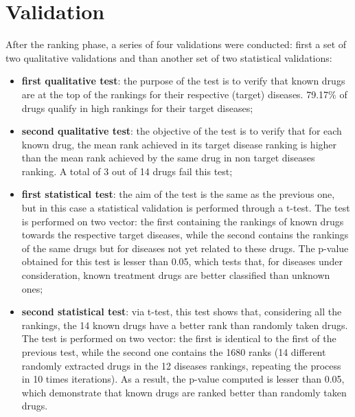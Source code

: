 

\section{Validation}
After the ranking phase, a series of four validations were conducted: first a set of two qualitative validations and than another set of two statistical validations:
\begin{itemize}
    \item \textbf{first qualitative test}: the purpose of the test is to verify that known drugs are at the top of the rankings for their respective (target) diseases. 79.17\% of drugs qualify in high rankings for their target diseases;
    \item \textbf{second qualitative test}: the objective of the test is to verify that for each known drug, the mean rank achieved in its target disease ranking is higher than the mean rank achieved by the same drug in non target diseases ranking. A total of 3 out of 14 drugs fail this test; 
    \item \textbf{first statistical test}: the aim of the test is the same as the previous one, but in this case a statistical validation is performed through a t-test.
    The test is performed on two vector: the first containing the rankings of known drugs towards the respective target diseases, while the second contains the rankings of the same drugs but for diseases not yet related to these drugs.
    The p-value obtained for this test is lesser than 0.05, which tests that, for diseases under consideration, known treatment drugs are better classified than unknown ones;
    \item \textbf{second statistical test}: via t-test, this test shows that, considering all the rankings, the 14 known drugs have a better rank than randomly taken drugs.
    The test is performed on two vector: the first is identical to the first of the previous test, while the second one contains the 1680 ranks (14 different randomly extracted drugs in the 12 diseases rankings, repeating the process in 10 times iterations).
    As a result, the p-value computed is lesser than 0.05, which demonstrate that known drugs are ranked better than randomly taken drugs.
\end{itemize}

